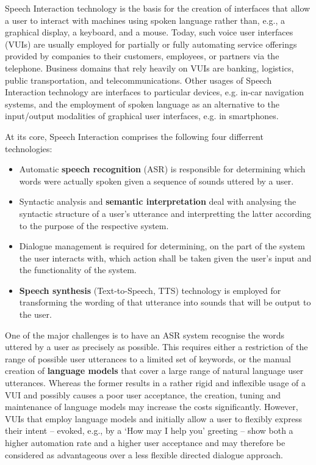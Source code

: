 \begin{multicols}{2}
Speech Interaction technology is the basis for the creation of interfaces that allow a user to interact with machines using spoken language rather than, e.g., a graphical display, a keyboard, and a mouse. Today, such voice user interfaces (VUIs) are usually employed for partially or fully automating service offerings provided by companies to their customers, employees, or partners via the telephone. Business domains that rely heavily on VUIs are banking, logistics, public transportation, and telecommunications. Other usages of Speech Interaction technology are interfaces to particular devices, e.g. in-car navigation systems, and the employment of spoken language as an alternative to the input/output modalities of graphical user interfaces, e.g. in smartphones.

At its core, Speech Interaction comprises the following four differrent technologies:

    \begin{itemize}
      \item Automatic \textbf{speech recognition} (ASR) is responsible for determining which words were actually spoken given a sequence of sounds uttered by a user.
      \item Syntactic analysis and \textbf{semantic interpretation} deal with analysing the syntactic structure of a user’s utterance and interpretting the latter according to the purpose of the respective system.
      \item Dialogue management is required for determining, on the part of the system the user interacts with, which action shall be taken given the user’s input and the functionality of the system.
      \item \textbf{Speech synthesis} (Text-to-Speech, TTS) technology is employed for transforming the wording of that utterance into sounds that will be output to the user. 

    \end{itemize}
    One of the major challenges is to have an ASR system recognise the words uttered by a user as precisely as possible. This requires either a restriction of the range of possible user utterances to a limited set of keywords, or the manual creation of \textbf{language models} that cover a large range of natural language user utterances. Whereas the former results in a rather rigid and inflexible usage of a VUI and possibly causes a poor user acceptance, the creation, tuning and maintenance of language models may increase the costs significantly. However, VUIs that employ language models and initially allow a user to flexibly express their intent – evoked, e.g., by a ‘How may I help you’ greeting – show both a higher automation rate and a higher user acceptance and may therefore be considered as advantageous over a less flexible directed dialogue approach.


\end{multicols}

